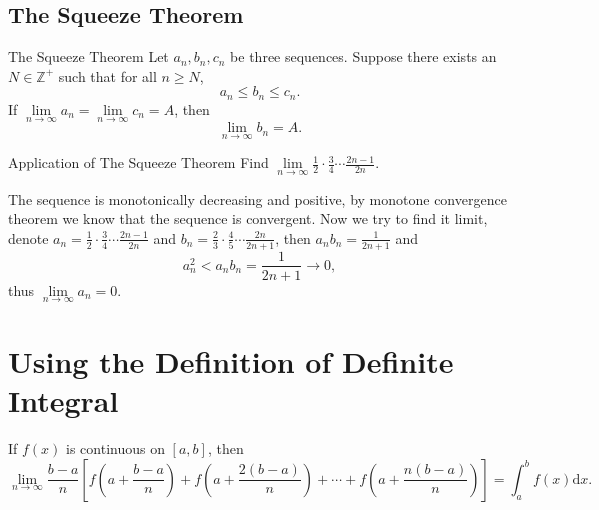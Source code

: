 \subsection{The Squeeze Theorem}

\begin{theorem}{The Squeeze Theorem}{}
  Let $a_n, b_n, c_n$ be three sequences.
  Suppose there exists an $N \in \mathbb{Z}^+$ such that for all $n \geq N$,
  \begin{equation}
    a_n \leq b_n \leq c_n.
  \end{equation}
  If $\lim \limits _{n \rightarrow \infty} a_n = \lim \limits _{n \rightarrow
    \infty} c_n = A$,
  then 
  \begin{equation}
    \lim \limits _{n \rightarrow \infty} b_n = A.
  \end{equation}
\end{theorem}

\begin{example}{Application of The Squeeze Theorem}{}
  Find $\lim \limits _{n \rightarrow \infty} \frac{1}{2} \cdot
  \frac{3}{4} \cdots \frac{2n-1}{2n}$.
\end{example}

\begin{solution}
  The sequence is monotonically decreasing and positive,
  by monotone convergence theorem we know that the sequence is convergent.
  Now we try to find it limit,
  denote $a_n = \frac{1}{2} \cdot \frac{3}{4} \cdots \frac{2n-1}{2n}$ and $b_n =
  \frac{2}{3} \cdot \frac{4}{5} \cdots \frac{2n}{2n+1}$,
  then $a_n b_n = \frac{1}{2n+1}$ and
  \begin{equation}
    a_n^2 < a_n b_n = \frac{1}{2n+1} \rightarrow 0,
  \end{equation}
  thus $\lim \limits _{n \rightarrow \infty} a_n = 0$.
\end{solution}


\section{Using the Definition of Definite Integral}

\begin{proposition}{}{}
  If $f(x)$ is continuous on $[a,b]$, then
  \begin{equation}
    \lim \limits _{n \rightarrow \infty} \frac{b - a}{n} \left[
      f(a + \frac{b - a}{n}) + f( a + \frac{2(b-a)}{n}) + \cdots + f(a + \frac{n(b-a)}{n})
    \right] = \int_a^b f(x) \mathrm{d} x.
  \end{equation}
\end{proposition}

